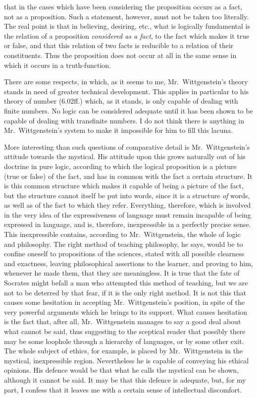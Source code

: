 that in the cases which have been considering the proposition occurs as a fact, not as a proposition. Such a statement, however, must not be taken too literally. The real point is that in believing, desiring, etc., what is logically fundamental is the relation of a proposition \emph{considered as a fact}, to the fact which makes it true or false, and that this relation of two facts is reducible to a relation of their constituents. Thus the proposition does not occur at all in the same sense in which it occurs in a truth-function.

There are some respects, in which, as it seems to me, Mr.\ Wittgenstein’s theory stands in need of greater technical development. This applies in particular to his theory of number (6.02ff.) which, as it stands, is only capable of dealing with finite numbers. No logic can be considered adequate until it has been shown to be capable of dealing with transfinite numbers. I do not think there is anything in Mr.\ Wittgenstein’s system to make it impossible for him to fill this lacuna.

More interesting than such questions of comparative detail is Mr.\ Wittgenstein’s attitude towards the mystical. His attitude upon this grows naturally out of his doctrine in pure logic, according to which the logical proposition is a picture (true or false) of the fact, and has in common with the fact a certain structure. It is this common structure which makes it capable of being a picture of the fact, but the structure cannot itself be put into words, since it is a structure \emph{of} words, as well as of the fact to which they refer. Everything, therefore, which is involved in the very idea of the expressiveness of language must remain incapable of being expressed in language, and is, therefore, inexpressible in a perfectly precise sense. This inexpressible contains, according to Mr.\ Wittgenstein, the whole of logic and philosophy. The right method of teaching philosophy, he says, would be to confine oneself to propositions of the sciences, stated with all possible clearness and exactness, leaving philosophical assertions to the learner, and proving to him, whenever he made them, that they are meaningless. It is true that the fate of Socrates might befall a man who attempted this method of teaching, but we are not to be deterred by that fear, if it is the only right method. It is not this that causes some hesitation in accepting Mr.\ Wittgenstein’s position, in spite of the very powerful arguments which he brings to its support. What causes hesitation is the fact that, after all, Mr.\ Wittgenstein manages to say a good deal about what cannot be said, thus suggesting to the sceptical reader that possibly there may be some loophole through a hierarchy of languages, or by some other exit. The whole subject of ethics, for example, is placed by Mr.\ Wittgenstein in the mystical, inexpressible region. Nevertheless he is capable of conveying his ethical opinions. His defence would be that what he calls the mystical can be shown, although it cannot be said. It may be that this defence is adequate, but, for my part, I confess that it leaves me with a certain sense of intellectual discomfort.

